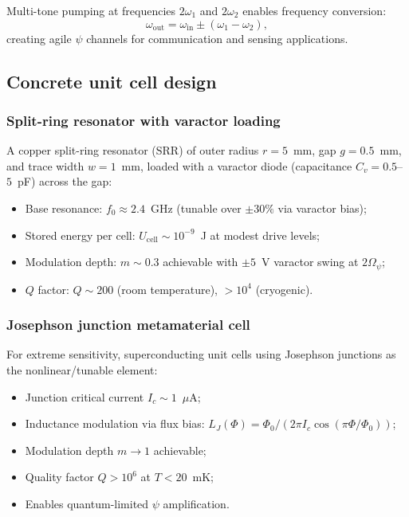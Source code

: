 \documentclass[12pt,aps,prd,twocolumn,superscriptaddress,nofootinbib]{revtex4-2}
\newcommand{\Opsi}{\Omega_\psi}
\begin{document}
Multi-tone pumping at frequencies $2\omega_1$ and $2\omega_2$
enables frequency conversion:
\begin{equation}
  \omega_{\mathrm{out}} = \omega_{\mathrm{in}} \pm (\omega_1 - \omega_2),
  \label{eq:freq_conversion}
\end{equation}
creating agile $\psi$ channels for communication and sensing
applications.

\subsection{Concrete unit cell design}
\label{sec:unit_cell}

\subsubsection{Split-ring resonator with varactor loading}

A copper split-ring resonator (SRR) of outer radius $r = 5$~mm, gap
$g = 0.5$~mm, and trace width $w = 1$~mm, loaded with a varactor diode
(capacitance $C_v = 0.5$--$5$~pF) across the gap:
\begin{itemize}[noitemsep]
  \item Base resonance: $f_0 \approx 2.4$~GHz (tunable over
    $\pm 30\%$ via varactor bias);
  \item Stored energy per cell: $U_{\mathrm{cell}} \sim 10^{-9}$~J at
    modest drive levels;
  \item Modulation depth: $m \sim 0.3$ achievable with
    $\pm 5$~V varactor swing at $2\Opsi$;
  \item $Q$ factor: $Q \sim 200$ (room temperature), $> 10^4$
    (cryogenic).
\end{itemize}

\subsubsection{Josephson junction metamaterial cell}

For extreme sensitivity, superconducting unit cells using Josephson
junctions as the nonlinear/tunable element:
\begin{itemize}[noitemsep]
  \item Junction critical current $I_c \sim 1$~$\mu$A;
  \item Inductance modulation via flux bias:
    $L_J(\Phi) = \Phi_0/(2\pi I_c\cos(\pi\Phi/\Phi_0))$;
  \item Modulation depth $m \to 1$ achievable;
  \item Quality factor $Q > 10^6$ at $T < 20$~mK;
  \item Enables quantum-limited $\psi$ amplification.
\end{itemize}
\end{document}
